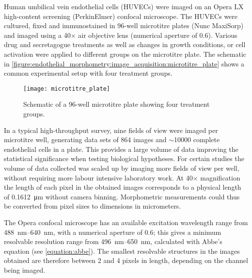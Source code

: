 Human umbilical vein endothelial cells (HUVECs) were imaged on an Opera LX high-content screening (PerkinElmer) confocal microscope. The HUVECs were cultured, fixed and immunostained in 96-well microtitre plates  (Nunc MaxiSorp) and imaged using a 40$\times$ air objective lens (numerical aperture of 0.6). Various drug and secretagogue treatments as well as changes in growth conditions, or cell activation were applied to different groups on the microtitre plate. The schematic in \autoref{figure:endothelial_morphometry:image_acquisition:microtitre_plate} shows a common experimental setup with four treatment groups.

\begin{figure}[htbp!]
	\centering
	\texttt{[image: microtitre\_plate]}
	\caption[Microtitre plate layout]{Schematic of a 96-well microtitre plate showing four treatment groups.}
	\label{figure:endothelial_morphometry:image_acquisition:microtitre_plate}
\end{figure}

In a typical high-throughput survey, nine fields of view were imaged per microtitre well, generating data sets of 864 images and $\sim$10000 complete endothelial cells in a plate. This provides a large volume of data improving the statistical significance when testing biological hypotheses. For certain studies the volume of data collected was scaled up by imaging more fields of view per well, without requiring more labour intensive laboratory work. At 40$\times$ magnification the length of each pixel in the obtained images corresponds to a physical length of \SI{0.1612}{\micro\meter} without camera binning. Morphometric measurements could thus be converted from pixel sizes to dimensions in micrometers.

The Opera confocal microscope has an available excitation wavelength range from \SIrange{488}{640}{\nano\meter}, with a numerical aperture of 0.6; this gives a minimum resolvable resolution range from \SIrange{496}{650}{\nano\meter}, calculated with Abbe's equation (see \autoref{equation:abbe}). The smallest resolvable structures in the images obtained are therefore between 2 and 4 pixels in length, depending on the channel being imaged.

